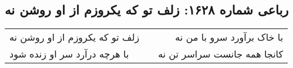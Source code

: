 \begin{center}
\section*{رباعی شماره ۱۶۲۸: زلف تو که یکروزم از او روشن نه}
\label{sec:1628}
\begin{longtable}{l p{0.5cm} r}
زلف تو که یکروزم از او روشن نه
&&
با خاک برآورد سرو با من نه
\\
با هرچه درآرد سر او زنده شود
&&
کانجا همه جانست سراسر تن نه
\\
\end{longtable}
\end{center}
